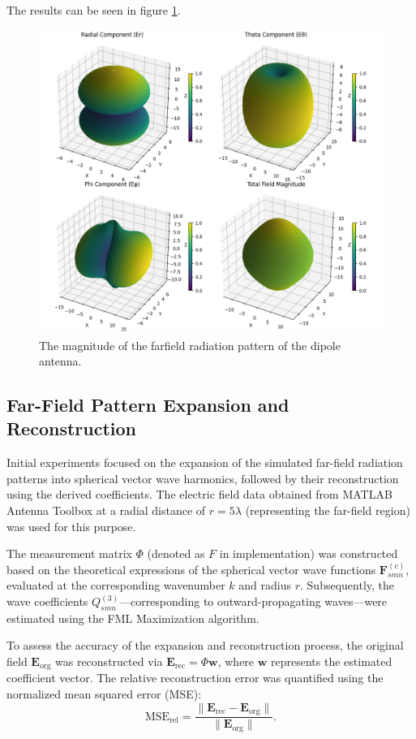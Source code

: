 \documentclass{article}
\begin{document}
The results can be seen in figure \ref{fig:dipole_rad}.
\begin{figure}[H]
    \centering
    \includegraphics[width=0.75\linewidth]{Figures/Dipol_radiation.png}
    \caption{The magnitude of the farfield radiation pattern of the dipole antenna.}
    \label{fig:dipole_rad}
\end{figure}


\subsection{Far-Field Pattern Expansion and Reconstruction}

Initial experiments focused on the expansion of the simulated far-field radiation patterns into spherical vector wave harmonics, followed by their reconstruction using the derived coefficients. The electric field data obtained from MATLAB Antenna Toolbox at a radial distance of $r = 5\lambda$ (representing the far-field region) was used for this purpose.

The measurement matrix $\Phi$ (denoted as $F$ in implementation) was constructed based on the theoretical expressions of the spherical vector wave functions $\mathbf{F}_{smn}^{(c)}$, evaluated at the corresponding wavenumber $k$ and radius $r$. Subsequently, the wave coefficients $Q_{smn}^{(3)}$—corresponding to outward-propagating waves—were estimated using the FML Maximization algorithm.

To assess the accuracy of the expansion and reconstruction process, the original field $\mathbf{E}_{\text{org}}$ was reconstructed via $\mathbf{E}_{\text{rec}} = \Phi \mathbf{w}$, where $\mathbf{w}$ represents the estimated coefficient vector. The relative reconstruction error was quantified using the normalized mean squared error (MSE):
\[
\text{MSE}_{\text{rel}} = \frac{\|\mathbf{E}_{\text{rec}} - \mathbf{E}_{\text{org}}\|}{\|\mathbf{E}_{\text{org}}\|}.
\label{eq:MSE}
\]
\end{document}
